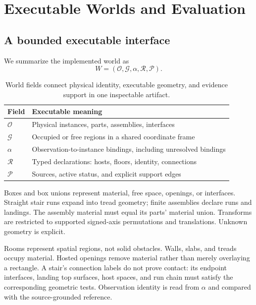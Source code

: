 \section{Executable Worlds and Evaluation}
\label{sec:evaluation}

\subsection{A bounded executable interface}
We summarize the implemented world as
\begin{equation}
W=(\mathcal O,\mathcal G,\alpha,\mathcal R,\mathcal P).
\end{equation}
\begin{table}[h]
\centering\small
\begin{tabular}{@{}lp{}@{}}
\toprule
Field & Executable meaning\\ \midrule
$\mathcal O$ & Physical instances, parts, assemblies, interfaces\\
$\mathcal G$ & Occupied or free regions in a shared coordinate frame\\
$\alpha$ & Observation-to-instance bindings, including unresolved bindings\\
$\mathcal R$ & Typed declarations: hosts, floors, identity, connections\\
$\mathcal P$ & Sources, active status, and explicit support edges\\
\bottomrule
\end{tabular}
\caption{World fields connect physical identity, executable geometry,
and evidence support in one inspectable artifact.}
\label{tab:world}
\end{table}

Boxes and box unions represent material, free space, openings, or interfaces.
Straight stair runs expand into tread geometry; finite assemblies declare
runs and landings. The assembly material must equal its parts' material
union. Transforms are restricted to supported signed-axis permutations
and translations. Unknown geometry is explicit.

Rooms represent spatial regions, not solid obstacles. Walls, slabs, and
treads occupy material. Hosted openings remove material rather than merely
overlaying a rectangle. A stair's connection labels do not prove contact:
its endpoint interfaces, landing top surfaces, host spaces, and run chain
must satisfy the corresponding geometric tests. Observation identity is
read from $\alpha$ and compared with the source-grounded reference.

